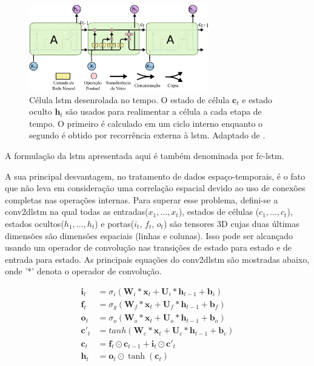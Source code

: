 \begin{figure}[h]
	\centering
	\includegraphics[width=0.7\textwidth]{figuras/lstm_no_tempo.pdf}
	\caption[Célula \acrshort{lstm} no tempo]{Célula \acrshort{lstm} desenrolada no tempo. O estado de célula $\textbf{c}_{t}$ e estado oculto $\textbf{h}_{t}$ são usados para realimentar a célula a cada etapa de tempo. O primeiro é calculado em um ciclo interno enquanto o segundo é obtido por recorrência externa à \acrshort{lstm}. Adaptado de \cite{Olah}.}
	\label{fig:lstm_time}
\end{figure}

A formulação da \acrshort{lstm} apresentada aqui é também denominada por \gls{fc-lstm}.

A sua principal desvantagem, no tratamento de dados espaço-temporais, é o fato que não leva em consideração uma correlação espacial devido ao uso de conexões completas nas operações internas.  
Para superar esse problema, defini-se a \gls{conv2dlstm} \cite{xingjian2015convolutional,FullResolution2017Toderici} na qual todas as entradas($x_1,..., x_t$), estados de células ($c_1,..., c_t$), estados ocultos($h_1,..., h_t$) e portas($i_t$, $f_t$, $o_t$) são tensores 3D cujas duas últimas dimensões são dimensões espaciais (linhas e colunas). Isso pode ser alcançado usando um operador de convolução nas transições de estado para estado e de entrada para estado. As principais equações do \acrshort{conv2dlstm} são mostradas abaixo, onde '*' denota o operador de convolução.

\begin{equation}
\label{eq:conlstm}
\begin{aligned}
\textbf{i}_t &= \sigma_{i}(\textbf{W}_i*\textbf{x}_t + \textbf{U}_i*\textbf{h}_{t-1} + \textbf{b}_i) \\
\textbf{f}_t &= \sigma_{g}(\textbf{W}_f*\textbf{x}_t + \textbf{U}_f*\textbf{h}_{t-1} + \textbf{b}_f) \\
\textbf{o}_t &= \sigma_{o}(\textbf{W}_o*\textbf{x}_t + \textbf{U}_o*\textbf{h}_{t-1} + \textbf{b}_o) \\   
\textbf{c}'_t &= tanh(\textbf{W}_c*\textbf{x}_t + \textbf{U}_c*\textbf{h}_{t-1} + \textbf{b}_c) \\
\textbf{c}_t &= \textbf{f}_t \odot \textbf{c}_{t-1} + \textbf{i}_t \odot \textbf{c}'_t \\
\textbf{h}_t & = \textbf{o}_t \odot \tanh(\textbf{c}_t)  
\end{aligned}
\end{equation}

